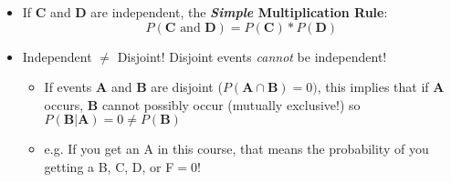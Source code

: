 \documentclass{article}
\begin{document}
\begin{itemize}
\begin{enumerate}
\begin{itemize}
\begin{itemize}
				\end{itemize}
				\item If \textbf{C} and \textbf{D} are independent, the \textbf{\emph{Simple} Multiplication Rule}:
							\begin{equation*}P(\textbf{C} \text{ and } \textbf{D}) = P(\textbf{C}) * P(\textbf{D}) \end{equation*}
				\item Independent $\neq$ Disjoint! Disjoint events \emph{cannot} be independent!
				\begin{itemize}
					\item If events  \textbf{A} and \textbf{B} are disjoint ($P(\textbf{A} \cap \textbf{B})=0)$, this implies that if \textbf{A} occurs, \textbf{B} cannot possibly occur (mutually exclusive!) so $P(\textbf{B}|\textbf{A})=0\neq P(\textbf{B})$
					\item e.g. If you get an A in this course, that means the probability of you getting a B, C, D, or F$=0$! 
				\end{itemize}
			\end{itemize}
\end{enumerate}
\end{itemize}
\end{document}
